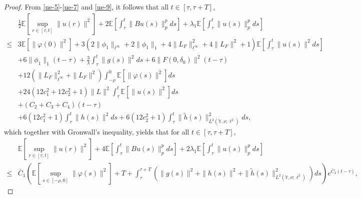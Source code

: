 \documentclass[11pt]{article}
\numberwithin{equation}{section}
\theoremstyle{plain}
\begin{document}
\begin{proof}
 From \eqref{ue-5}-\eqref{ue-7} and \eqref{ue-9},
 it follows that all $ t \in [\tau, \tau + T] $,
 \begin{align*}
       & \frac{1}{2} \mathbb{E} \left[ \sup_{r \in [\tau, t]} \|u(r)\|^2 \right]
         + 2 \mathbb{E} \left[ \int_{\tau}^{t} \|B u(s)\|_p^p ds \right]
         + \lambda_1 \mathbb{E} \left[ \int_{\tau}^{t} \|u(s)\|^p_p ds \right]  \nonumber \\
  \le & 3 \mathbb{E} \left[ \|\varphi(0)\|^2 \right]
         + 3 \left( 2 \|\phi_1\|_{\ell^\infty} + 2 \|\phi_1\|_1 + 4 \|L_{F}\|_{\ell^\infty}^2 + 4 \|L_{F}\|^2 + 1
             \right)
           \mathbb{E}
              \left[ \int_{\tau}^{t} \| u(s)\|^2 ds
              \right]  \nonumber \\
       & + 6 \|\phi_1\|_1 (t-\tau)
         + \frac{3}{\lambda} \int_{\tau}^{t}  \|g(s)\|^2 ds
         + 6 \|F(0,\delta_0)\|^2 (t-\tau)  \nonumber \\
       & + 12 \left( \|L_{F}\|_{\ell^\infty}^2 + \|L_{F}\|^2 \right)
              \int_{-\rho}^{0} \mathbb{E} \left[ \|\varphi(s)\|^2 \right] ds \nonumber \\
       & + 24 \left( 12 c_1^2 + 12 c_2^2 + 1 \right) \|L\|^2
            \int_{\tau}^{t}
               \mathbb{E}\left[ \|u(s)\|^2 \right] ds  \nonumber \\
       & + \left( C_2 +C_3 +C_4
           \right) (t-\tau)  \nonumber \\
       & + 6 \left( 12 c_1^2 + 1 \right)
               \int_{\tau}^{t} \|h(s)\|^2 ds
         + 6 \left( 12 c_2^2 + 1 \right)
            \int_{\tau}^{t} \|\widetilde{h}(s) \|^2
             _{L^2(\mathbb{Y}, \nu; \ell^2)}    ds
              ,
 \end{align*}
 which together with Gronwall's inequality, yields that for all $t \in [\tau, \tau+T]$,
 \begin{align*}
       & \mathbb{E} \left[ \sup_{r \in [\tau, t]} \|u(r)\|^2 \right]
         + 4 \mathbb{E} \left[ \int_{\tau}^{t} \|B u(s)\|_p^p ds \right]
         + 2 \lambda_1 \mathbb{E} \left[ \int_{\tau}^{t} \|u(s)\|^p_p ds \right]  \nonumber \\
  \le & \bar{C}_1  
         \left( \mathbb{E} \left[ \sup_{s \in [-\rho, 0]} \|\varphi(s)\|^2 \right]
                + T
                + \int_{\tau}^{\tau+T}
                        \left( \|g(s)\|^2 + \|h(s)\|^2 + \|\widetilde{h}(s)\|^2
         _{L^2(\mathbb{Y}, \nu; \ell^2)}                   
                        \right)
                  ds
         \right)
         e^{\bar{C}_2 (t-\tau) },

\end{align*}
\end{proof}
\end{document}
